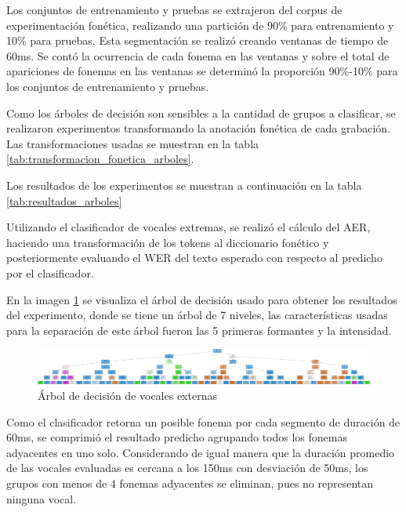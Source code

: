 Los conjuntos de entrenamiento y pruebas se extrajeron del corpus de experimentación fonética, realizando una partición de 90\% para entrenamiento y 10\% para pruebas. Esta segmentación se realizó creando ventanas de tiempo de 60ms. Se contó la ocurrencia de cada fonema en las ventanas y sobre el total de apariciones de fonemas en las ventanas se determinó la proporción 90\%-10\% para los conjuntos de entrenamiento y pruebas.

Como los árboles de decisión son sensibles a la cantidad de grupos a clasificar, se realizaron experimentos transformando la anotación fonética de cada grabación. Las transformaciones usadas se muestran en la tabla \ref{tab:transformacion_fonetica_arboles}.



Los resultados de los experimentos se muestran a continuación en la tabla \ref{tab:resultados_arboles}



Utilizando el clasificador de vocales extremas, se realizó el cálculo del AER, haciendo una transformación de los tokens al diccionario fonético y posteriormente evaluando el WER del texto esperado con respecto al predicho por el clasificador.

En la imagen \ref{img:decision_tree} se visualiza el árbol de decisión usado para obtener los resultados del experimento, donde se tiene un árbol de 7 niveles, las características usadas para la separación de este árbol fueron las 5 primeras formantes y la intensidad.

\begin{figure}[H]
\caption{Árbol de decisión de vocales externas}
\label{img:decision_tree}
\begin{center}
\includegraphics[width=1.1\textwidth,angle=90]{imagenes/external_vowels.png}
\end{center}
\end{figure}

Como el clasificador retorna un posible fonema por cada segmento de duración de 60ms, se comprimió el resultado predicho agrupando todos los fonemas adyacentes en uno solo. Considerando de igual manera que la duración promedio de las vocales evaluadas es cercana a los 150ms con desviación de 50ms, los grupos con menos de 4 fonemas adyacentes se eliminan, pues no representan ninguna vocal.

